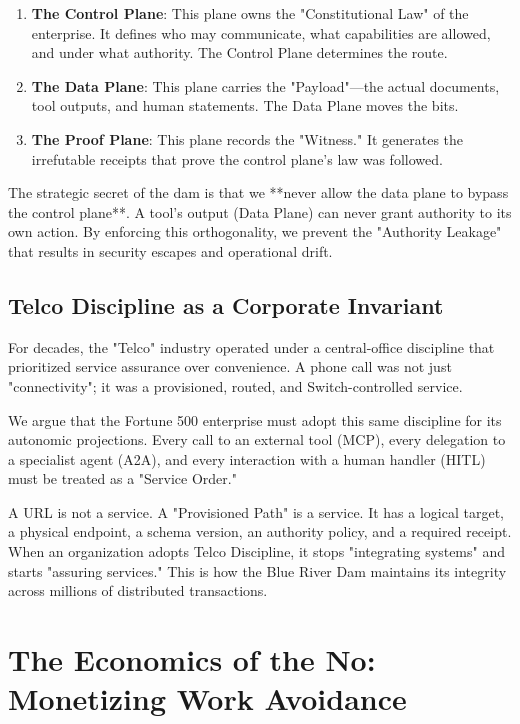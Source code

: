 \documentclass[12pt,a4paper,oneside]{book}
\begin{document}
\begin{enumerate}
    \item \textbf{The Control Plane}: This plane owns the "Constitutional Law" of the enterprise. It defines who may communicate, what capabilities are allowed, and under what authority. The Control Plane determines the route.
    \item \textbf{The Data Plane}: This plane carries the "Payload"—the actual documents, tool outputs, and human statements. The Data Plane moves the bits.
    \item \textbf{The Proof Plane}: This plane records the "Witness." It generates the irrefutable receipts that prove the control plane's law was followed.
\end{enumerate}

The strategic secret of the dam is that we **never allow the data plane to bypass the control plane**. A tool’s output (Data Plane) can never grant authority to its own action. By enforcing this orthogonality, we prevent the "Authority Leakage" that results in security escapes and operational drift.

\section{Telco Discipline as a Corporate Invariant}
For decades, the "Telco" industry operated under a central-office discipline that prioritized service assurance over convenience. A phone call was not just "connectivity"; it was a provisioned, routed, and Switch-controlled service. 

We argue that the Fortune 500 enterprise must adopt this same discipline for its autonomic projections. Every call to an external tool (MCP), every delegation to a specialist agent (A2A), and every interaction with a human handler (HITL) must be treated as a "Service Order." 

A URL is not a service. A "Provisioned Path" is a service. It has a logical target, a physical endpoint, a schema version, an authority policy, and a required receipt. When an organization adopts Telco Discipline, it stops "integrating systems" and starts "assuring services." This is how the Blue River Dam maintains its integrity across millions of distributed transactions.

\chapter{The Economics of the No: Monetizing Work Avoidance}
\end{document}
